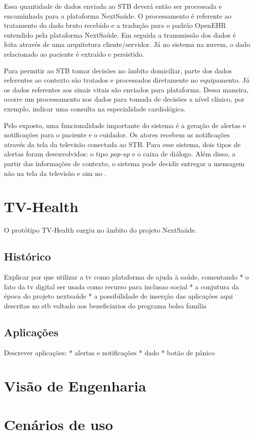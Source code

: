 Essa quantidade de dados enviada ao STB deverá então ser processada e encaminhada
para a plataforma NextSaúde. O processamento é referente ao tratamento do dado
bruto recebido e a tradução para o padrão OpenEHR entendido pela plataforma
NextSaúde. Em seguida a transmissão dos dados é feita através de uma
arquitetura  cliente/servidor. Já no sistema na nuvem, o dado relacionado ao
paciente é extraído e persistido.

Para permitir ao STB tomar decisões no âmbito domiciliar, parte dos dados
referentes ao contexto são tratados e processados diretamente no equipamento.
Já os dados referentes aos sinais vitais são enviados para plataforma. Dessa 
maneira, ocorre um processamento nos dados para tomada de decisões a nível
clínico, por exemplo, indicar uma consulta na especialidade cardiológica.

Pelo exposto, uma funcionalidade importante do sistema é a geração de alertas e
notificações para o paciente e o cuidador. Os atores recebem as notificações
através da tela da televisão conectada ao STB. Para esse sistema, dois tipos de
alertas foram desenvolvidos: o tipo \textit{pop-up} e o caixa de diálogo.
Além disso, a partir das informações de contexto, o sistema pode decidir
entregar a mensagem não na tela da televisão e sim no \smartphone.


\section{TV-Health} \label{sec:tv-health} 

O protótipo TV-Health surgiu no âmbito do projeto NextSaúde. 

\subsection{Histórico}\label{subsec:historico-tv-health}
Explicar por que utilizar a tv como plataforma de ajuda à saúde, comentando 
 * o fato da tv digital ser usada como recurso para inclusao social
 * a conjutura da época do projeto nextsaúde
 * a possibilidade de inserção das aplicações aqui descritas no stb voltado aos
 beneficiarios do programa bolsa família

\subsection{Aplicações}\label{subsec:aplicacoes-tv-health}

Descrever aplicações:
  * alertas e notificações
  * dado
  * botão de pânico

\section{Visão de Engenharia} \label{sec:visao-engenharia}

\lipsum[1]

\section{Cenários de uso} \label{sec:cenarios-de-uso}

\lipsum[1]